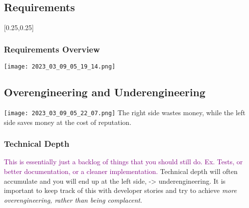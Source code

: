 \documentclass[main.tex,fontsize=8pt,paper=a4,paper=portrait,DIV=calc,]{scrartcl}
\begin{document}
\subsection{Requirements}
[0.25,0.25]

\subsubsection{Requirements Overview}
\texttt{[image: 2023\_03\_09\_05\_19\_14.png]}

\subsection{Overengineering and Underengineering}
\texttt{[image: 2023\_03\_09\_05\_22\_07.png]}\newline
The right side wastes money, while the left side saves money at the cost of reputation.

\subsubsection{Technical Depth}
\textcolor{purple}{This is essentially just a backlog of things that you should still do. Ex. Tests, or better documentation, or a cleaner implementation.}\newline
Technical depth will often accumulate and you will end up at the left side, -> underengineering.\newline
It is important to keep track of this with developer stories and try to achieve \emph{more overengineering, rather than being complacent}.
\end{document}
